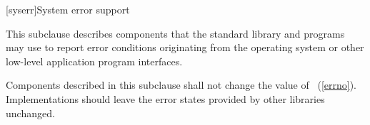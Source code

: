 [syserr]{System error support}

\pnum
This subclause describes components that the standard library and
\Cpp programs may use to report error conditions originating from
the operating system or other low-level application program interfaces.

\pnum
Components described in this subclause shall not change the value of
~(\ref{errno}).
Implementations should leave the error states provided by other
libraries unchanged.


%
%
%
%
%
%
%
%
%
